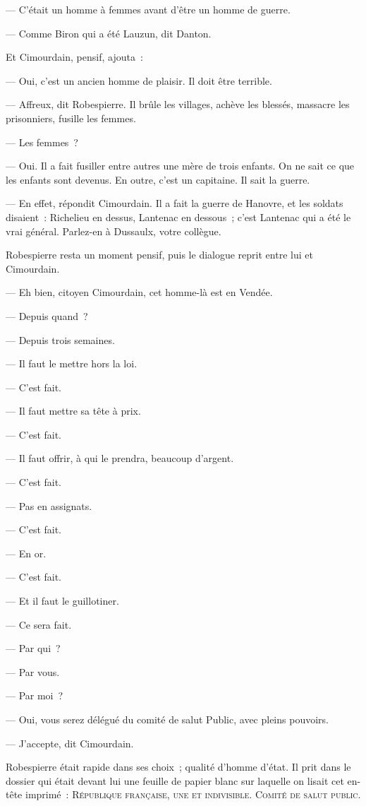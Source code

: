 \documentclass[french,twoside]{book} %
\begin{document}
— C’était un homme à femmes avant d’être un homme de guerre.\par
— Comme Biron qui a été Lauzun, dit Danton.\par
Et Cimourdain, pensif, ajouta :\par
— Oui, c’est un ancien homme de plaisir. Il doit être terrible.\par
— Affreux, dit Robespierre. Il brûle les villages, achève les blessés, massacre les prisonniers, fusille les femmes.\par
— Les femmes ?\par
— Oui. Il a fait fusiller entre autres une mère de trois enfants. On ne sait ce que les enfants sont devenus. En outre, c’est un capitaine. Il sait la guerre.\par
— En effet, répondit Cimourdain. Il a fait la guerre de Hanovre, et les soldats disaient : Richelieu en dessus, Lantenac en dessous ; c’est Lantenac qui a été le vrai général. Parlez-en à Dussaulx, votre collègue.\par
 Robespierre resta un moment pensif, puis le dialogue reprit entre lui et Cimourdain.\par
— Eh bien, citoyen Cimourdain, cet homme-là est en Vendée.\par
— Depuis quand ?\par
— Depuis trois semaines.\par
— Il faut le mettre hors la loi.\par
— C’est fait.\par
— Il faut mettre sa tête à prix.\par
— C’est fait.\par
— Il faut offrir, à qui le prendra, beaucoup d’argent.\par
— C’est fait.\par
— Pas en assignats.\par
— C’est fait.\par
— En or.\par
— C’est fait.\par
— Et il faut le guillotiner.\par
— Ce sera fait.\par
— Par qui ?\par
— Par vous.\par
— Par moi ?\par
— Oui, vous serez délégué du comité de salut Public, avec pleins pouvoirs.\par
— J’accepte, dit Cimourdain.\par
Robespierre était rapide dans ses choix ; qualité d’homme d’état. Il prit dans le dossier qui était devant lui une feuille de papier blanc sur laquelle on lisait cet en-tête imprimé : R{\scshape épublique française, une et indivisible}. C{\scshape omité de salut public}.\par
\end{document}

